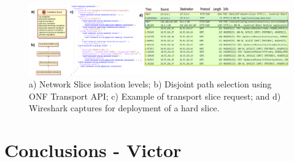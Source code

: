 \documentclass[journal,article,submit,moreauthors,pdftex]{Definitions/mdpi}
\begin{document}
\begin{figure}[tb]%
\centering
	\centering
		\includegraphics[width=\linewidth]{results.png}
\vspace{-7pt} \caption{a) Network Slice isolation levels; b) Disjoint path selection using ONF Transport API; c) Example of transport slice request; and d) Wireshark captures for deployment of a hard slice.}
\label{fig:results}
\vspace{-17pt}
\end{figure}





\section{Conclusions - Victor}



\end{document}
